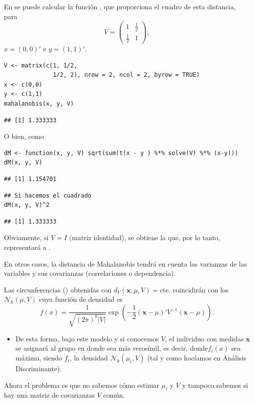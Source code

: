 En  se puede calcular la función , que proporciona el cuadro de esta distancia, para \[ V=\begin{pmatrix}
1 & \tfrac{1}{2}\\
\tfrac{1}{2} & 1
\end{pmatrix}, \]$x=(0,0)'$ e $y=(1,1)'$.
\begin{lstlisting}
V <- matrix(c(1, 1/2,
              1/2, 2), nrow = 2, ncol = 2, byrow = TRUE)
x <- c(0,0)
y <- c(1,1)
mahalanobis(x, y, V)
\end{lstlisting}
\begin{verbatim}
## [1] 1.333333
\end{verbatim}
O bien, como 
\begin{lstlisting}
dM <- function(x, y, V) sqrt(sum(t(x - y ) %*% solve(V) %*% (x-y)))
dM(x, y, V)
\end{lstlisting}
\begin{verbatim}
## [1] 1.154701
\end{verbatim}
\begin{lstlisting}
## Si hacemos el cuadrado
dM(x, y, V)^2
\end{lstlisting}
\begin{verbatim}
## [1] 1.333333
\end{verbatim}
Obviamente, si $V=I$ (matriz identidad), se obtiene la  que, por lo tanto, representará a .

En otros casos, la distancia de Mahalanobis tendrá en cuenta las varianzas de las variables y sus covarianzas (correlaciones o dependencia).

Las circunferencias () obtenidas con $d_V(\mathbf{x},\mu,V)=\mathrm{cte}.$ coincidirán con los  $\mathcal{N}_k(\mu,V)$ cuya función de densidad es \[ f(x)=\dfrac{1}{\sqrt{(2\pi)^k|V|}}\exp\left(-\dfrac{1}{2}(\mathbf{x}-\mu)'V^{-1}(\mathbf{x}-\mu)\right). \]
\begin{itemize}
\item De esta forma, bajo este modelo y si conocemos $V$, el individuo con medidas $\mathbf{x}$ se asignará al grupo en donde sea más verosímil, es decir, donde$f_i(x)$ sea máxima, siendo $f_i$, la densidad $\mathcal{N}_k(\mu_i, V)$ (tal y como hacíamos en Análisis Discriminante).
\end{itemize}
Ahora el problema es que no sabemos cómo estimar $\mu_i$ y $V$ y tampoco sabemos si hay una matriz de covarianzas $V$ común.
